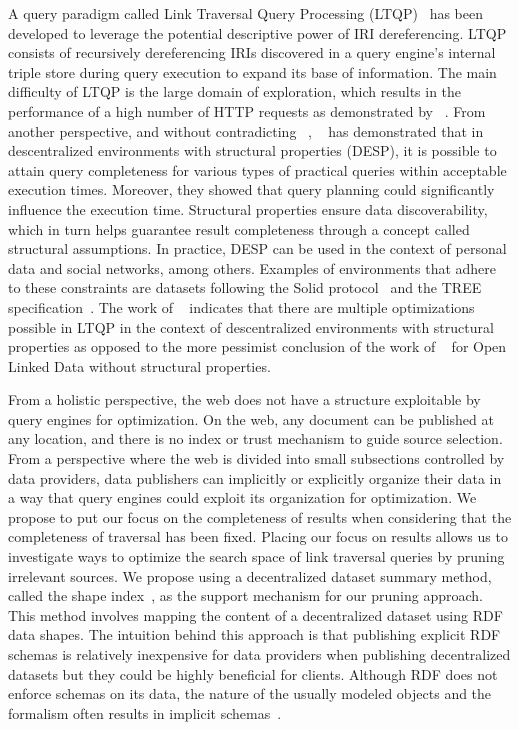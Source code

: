 A query paradigm called Link Traversal Query Processing (LTQP)~\cite{Hartig2012} has been developed to leverage the potential descriptive power of IRI dereferencing.
LTQP consists of recursively dereferencing IRIs discovered in a query engine's internal triple store during query execution to expand its base of information.
The main difficulty of LTQP is the large domain of exploration, which results in the performance of a high number of HTTP requests as demonstrated by \citeauthor{hartig2016walking}~\cite{hartig2016walking}.
From another perspective, and without contradicting \citeauthor{hartig2016walking}~\cite{hartig2016walking}, \citeauthor{Taelman2023}~\cite{Taelman2023} has demonstrated that in descentralized environments with structural properties (DESP),
it is possible to attain query completeness for various types of practical queries within acceptable execution times.
Moreover, they showed that query planning could significantly influence the execution time.
Structural properties ensure data discoverability, which in turn helps guarantee result completeness through a concept called structural assumptions.
In practice, DESP can be used in the context of personal data and social networks, among others.
Examples of environments that adhere to these constraints are datasets following the Solid protocol~\cite{Taelman2023} and the TREE specification~\cite{tam_iswc_traversalsensortree_2024}.
The work of \citeauthor{Taelman2023}~\cite{Taelman2023} indicates that there are multiple optimizations possible in LTQP in the context of descentralized environments with structural properties as opposed to the
more pessimist conclusion of the work of \citeauthor{hartig2016walking}~\cite{hartig2016walking} for Open Linked Data without structural properties.

From a holistic perspective, the web does not have a structure exploitable by query engines for optimization.
On the web, any document can be published at any location, and there is no index or trust mechanism to guide source selection.
From a perspective where the web is divided into small subsections controlled by data providers, data publishers can implicitly or explicitly organize their data  
in a way that query engines could exploit its organization for optimization.
We propose to put our focus on the completeness of results when considering that the completeness of traversal has been fixed.
Placing our focus on results allows us to investigate ways to optimize the search space of link traversal queries by pruning irrelevant sources.
We propose using a decentralized dataset summary method, called the shape index~\cite{tam2024opportunitiesshapebasedoptimizationlink}, as the support mechanism for our pruning approach.
This method involves mapping the content of a decentralized dataset using RDF data shapes.
The intuition behind this approach is that publishing explicit RDF schemas is relatively inexpensive for data providers when publishing decentralized datasets but they could be highly beneficial for clients.
Although RDF does not enforce schemas on its data, the nature of the usually modeled objects and the formalism often results in implicit schemas~\cite{Neumann2011CharacteristicSA}.

